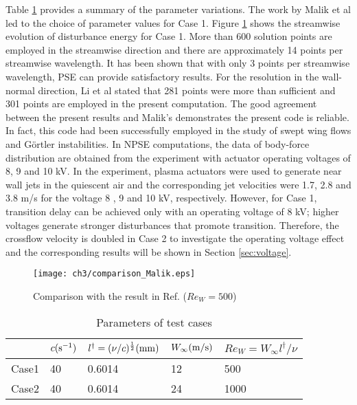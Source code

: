 Table \ref{t:testcase} provides a summary of the parameter variations. The work by Malik et al \cite{Malik1994} led to the choice of parameter values for Case 1. Figure \ref{f:Com_Malik1994} shows the streamwise evolution of disturbance energy for Case 1. More than 600 solution points are employed in the streamwise direction and there are approximately 14 points per streamwise wavelength. It has been shown that with only 3 points per streamwise wavelength, PSE  can provide satisfactory results\cite{Joslin1992}. For the resolution in the wall-normal direction, Li et al\cite{Li2015a} stated that 281 points were more than sufficient and 301 points are employed in the present computation. The good agreement between the present results and Malik's \cite{Malik1994} demonstrates the present code is reliable. In fact, this code had been successfully employed in the study of swept wing flows\cite{Xu2011a,Xu2011b} and G\"ortler instabilities\cite{Ren2014a,Ren2014b,Ren2014c,Ren2015,Ren2016}. In NPSE computations, the data of body-force distribution are obtained from the experiment \cite{kriegseis2013velocity} with actuator operating voltages of 8, 9 and 10 kV. In the experiment, plasma actuators were used to generate near wall jets in the quiescent air and the corresponding jet velocities were 1.7, 2.8 and 3.8 m/s for the voltage 8 , 9 and 10 kV, respectively. However, for Case 1, transition delay can be achieved only with an operating voltage of 8 kV; higher voltages generate stronger disturbances that promote transition. Therefore, the crossflow velocity is doubled in Case 2 to investigate the operating voltage effect and the corresponding results will be shown in Section \ref{sec:voltage}.
\begin{figure}
  \centering
  \texttt{[image: ch3/comparison\_Malik.eps]}\\
  \caption{Comparison with the result in Ref.\cite{Malik1994} ($Re_W=500$)}\label{f:Com_Malik1994}
\end{figure}
\begin{table}
  \caption{Parameters of test cases}\label{t:testcase}
  \centering
  \begin{tabular}{p{2.3cm}<{\centering}|p{2.5cm}<{\centering}p{3.5cm}<{\centering}p{2.5cm}<{\centering}p{3.5cm}<{\centering}}%
  \hline
        & $c{\rm (s^{-1})}$ & $l^\dagger=(\nu/c)^{\frac{1}{2}} ({\rm mm})$ & $W_\infty{\rm (m/s)}$ & $Re_W=W_\infty l^\dagger/\nu$ \\
  \hline
  Case1 & 40          & 0.6014            & 12              & 500 \\
  Case2 & 40          & 0.6014            & 24              & 1000 \\
  \hline
  \end{tabular}

\end{table}


